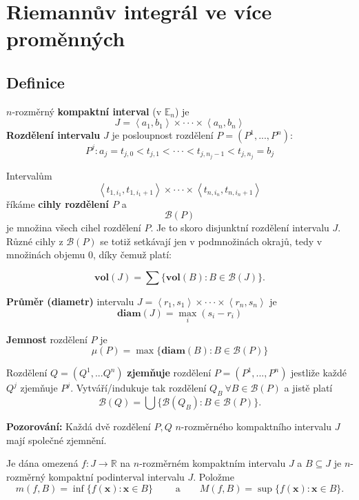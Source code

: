 \documentclass[../main.tex]{subfiles}
\begin{document}
\section{Riemannův integrál ve více proměnných}
\subsection{Definice}

\noindent
$n$-rozměrný \textbf{kompaktní interval} (v $\mathbb{E}_n$) je 
\[J = \left<a_1,b_1\right> \times \cdot \cdot \cdot \times \left<a_n,b_n\right>\]
\noindent
\textbf{Rozdělení intervalu} $J$ je posloupnost rozdělení $P = (P^1,...,P^n)$:
\[P^j : a_j = t_{j,0} < t_{j,1} < \cdot \cdot \cdot < t_{j,n_j-1} < t_{j,n_j} = b_j\]

\noindent
Intervalům
\[\left<t_{1,i_1},t_{1,i_1+1}\right> \times \cdot \cdot \cdot \times \left<t_{n,i_n},t_{n,i_n+1}\right>\]
říkáme \textbf{cihly rozdělení $P$} a $$\mathcal{B}(P)$$ je množina všech cihel rozdělení $P$. Je to skoro disjunktní rozdělení intervalu $J$.
Různé cihly z $\mathcal{B}(P)$ se totiž setkávají jen v podmnožinách okrajů, tedy v množinách objemu 0, díky čemuž platí:

\[\textbf{vol}(J) = \sum \{\textbf{vol}(B) : B \in \mathcal{B}(J)\}.\]

\noindent
\textbf{Průměr (diametr)} intervalu $J = \left<r_1,s_1\right> \times \cdot \cdot \cdot \times \left<r_n,s_n\right>$ je
\[\textbf{diam}(J) = \max_i (s_i - r_i)\]

\noindent
\textbf{Jemnost} rozdělení $P$ je 
\[\mu(P) = \max \{\textbf{diam}(B) : B \in \mathcal{B}(P)\}\]

\noindent
Rozdělení $Q = (Q^1,...Q^n) $ \textbf{zjemňuje} rozdělení $P = (P^1,...,P^n)$ jestliže každé $Q^j$ zjemňuje $P^j$.
Vytváří/indukuje tak rozdělení $Q_B\ \forall B \in \mathcal{B}(P)$ a jistě platí
\[\mathcal{B}(Q) = \bigcup \{\mathcal{B}(Q_B) : B \in \mathcal{B}(P)\}.\]

\noindent
\textbf{Pozorování:} 
Každá dvě rozdělení $P,Q$ $n$-rozměrného kompaktního intervalu $J$ mají společné zjemnění.

\vskip 5mm

\noindent
Je dána omezená $f: J \rightarrow \mathbb{R}$ na $n$-rozměrném kompaktním intervalu $J$ a $B \subseteq J$ je 
$n$-rozměrný kompaktní podinterval intervalu $J$. Položme
\[m(f,B) = \inf\{f(\textbf{x}) : \textbf{x} \in B\} \qquad \text{ a} \qquad M(f,B) = \sup\{f(\textbf{x}) : \textbf{x} \in B\}.\]
\end{document}
